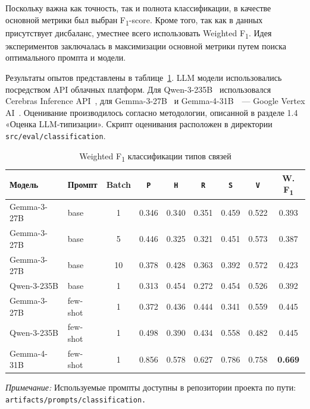 Поскольку важна как точность, так и полнота классификации,
в качестве основной метрики был выбран F\textsubscript{1}-score.
Кроме того, так как в данных присутствует дисбаланс,
уместнее всего использовать Weighted F\textsubscript{1}.
Идея экспериментов заключалась в максимизации основной метрики
путем поиска оптимального промпта и модели.

Результаты опытов представлены в таблице~\ref{tab:classification_results}.
LLM модели использовались посредством API облачных платформ.
Для Qwen-3-235B~\cite{qwen_3_235b} использовался Cerebras Inference API~\cite{cerebras_api},
для Gemma-3-27B~\cite{gemma_3_27b} и Gemma-4-31B~\cite{gemma_4_31b}~--- Google Vertex AI~\cite{vertex_ai}.
Оценивание производилось согласно методологии,
описанной в разделе 1.4 «Оценка LLM-типизации».
Скрипт оценивания расположен в директории \texttt{src/eval/classification}.

\begin{table}[H]
    \caption{Weighted F\textsubscript{1} классификации типов связей}
    \label{tab:classification_results}
    \centering
    \begin{tabular}{llccccccc}
        \hline
        \textbf{Модель} & \textbf{Промпт} & \textbf{Batch}                 &
        \texttt{P}      & \texttt{H}      & \texttt{R}                     &
        \texttt{S}      & \texttt{V}      & \textbf{W. F\textsubscript{1}}                                                          \\
        \hline
        Gemma-3-27B     & base            & 1                              & 0.346 & 0.340 & 0.351 & 0.459 & 0.522 & 0.393          \\
        Gemma-3-27B     & base            & 5                              & 0.446 & 0.325 & 0.321 & 0.451 & 0.573 & 0.387          \\
        Gemma-3-27B     & base            & 10                             & 0.378 & 0.428 & 0.363 & 0.392 & 0.572 & 0.423          \\
        Qwen-3-235B     & base            & 1                              & 0.313 & 0.454 & 0.272 & 0.454 & 0.526 & 0.392          \\
        Gemma-3-27B     & few-shot        & 1                              & 0.372 & 0.436 & 0.444 & 0.341 & 0.559 & 0.445          \\
        Qwen-3-235B     & few-shot        & 1                              & 0.498 & 0.390 & 0.434 & 0.558 & 0.482 & 0.445          \\
        Gemma-4-31B     & few-shot        & 1                              & 0.856 & 0.578 & 0.627 & 0.786 & 0.758 & \textbf{0.669} \\
        \hline
    \end{tabular}

    \vspace{1ex}
    \raggedright\footnotesize
    \textit{Примечание:} Используемые промпты
    доступны в репозитории проекта по пути: \texttt{artifacts/prompts/classification.} \\
\end{table}

